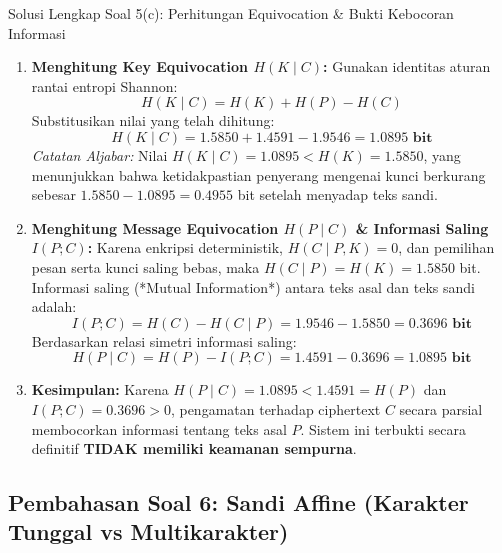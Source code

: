 \documentclass[11pt,a4paper]{article}
\begin{document}
\begin{solusibox}{Solusi Lengkap Soal 5(c): Perhitungan Equivocation \& Bukti Kebocoran Informasi}
\begin{enumerate}[leftmargin=*]
    \item \textbf{Menghitung Key Equivocation $H(K \mid C)$:}
    Gunakan identitas aturan rantai entropi Shannon:
    \[
    H(K \mid C) = H(K) + H(P) - H(C)
    \]
    Substitusikan nilai yang telah dihitung:
    \[
    H(K \mid C) = 1.5850 + 1.4591 - 1.9546 = \mathbf{1.0895 \text{ bit}}
    \]
    \textit{Catatan Aljabar:} Nilai $H(K \mid C) = 1.0895 < H(K) = 1.5850$, yang menunjukkan bahwa ketidakpastian penyerang mengenai kunci berkurang sebesar $1.5850 - 1.0895 = 0.4955$ bit setelah menyadap teks sandi.
    
    \item \textbf{Menghitung Message Equivocation $H(P \mid C)$ \& Informasi Saling $I(P; C)$:}
    Karena enkripsi deterministik, $H(C \mid P, K) = 0$, dan pemilihan pesan serta kunci saling bebas, maka $H(C \mid P) = H(K) = 1.5850$ bit. Informasi saling (*Mutual Information*) antara teks asal dan teks sandi adalah:
    \[
    I(P; C) = H(C) - H(C \mid P) = 1.9546 - 1.5850 = \mathbf{0.3696 \text{ bit}}
    \]
    Berdasarkan relasi simetri informasi saling:
    \[
    H(P \mid C) = H(P) - I(P; C) = 1.4591 - 0.3696 = \mathbf{1.0895 \text{ bit}}
    \]
    \item \textbf{Kesimpulan:}
    Karena $H(P \mid C) = 1.0895 < 1.4591 = H(P)$ dan $I(P; C) = 0.3696 > 0$, pengamatan terhadap ciphertext $C$ secara parsial membocorkan informasi tentang teks asal $P$.
    Sistem ini terbukti secara definitif \textbf{TIDAK memiliki keamanan sempurna}.
\end{enumerate}
\end{solusibox}

\newpage

\subsection{Pembahasan Soal 6: Sandi Affine (Karakter Tunggal vs Multikarakter)}
\end{document}
